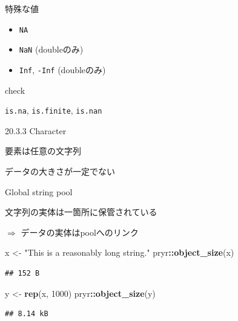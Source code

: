 \documentclass[ignorenonframetext,]{beamer}
\newenvironment{Shaded}{\begin{snugshade}}{\end{snugshade}}
\newcommand{\KeywordTok}[1]{\textcolor[rgb]{0.13,0.29,0.53}{\textbf{#1}}}
\newcommand{\DecValTok}[1]{\textcolor[rgb]{0.00,0.00,0.81}{#1}}
\newcommand{\StringTok}[1]{\textcolor[rgb]{0.31,0.60,0.02}{#1}}
\newcommand{\OperatorTok}[1]{\textcolor[rgb]{0.81,0.36,0.00}{\textbf{#1}}}
\newcommand{\NormalTok}[1]{#1}
\providecommand{\tightlist}{%
  \setlength{\itemsep}{0pt}\setlength{\parskip}{0pt}}
\begin{document}
\begin{frame}[fragile]{特殊な値}

\begin{itemize}
\tightlist
\item
  \texttt{NA}
\item
  \texttt{NaN} (doubleのみ)
\item
  \texttt{Inf}, \texttt{-Inf} (doubleのみ)
\end{itemize}

\begin{block}{check}

\texttt{is.na}, \texttt{is.finite}, \texttt{is.nan}

\end{block}

\end{frame}

\begin{frame}{20.3.3 Character}

要素は任意の文字列

データの大きさが一定でない

\end{frame}

\begin{frame}[fragile]{Global string pool}

文字列の実体は一箇所に保管されている

\(\Rightarrow\) データの実体はpoolへのリンク

\begin{Shaded}
\begin{Highlighting}[]
\NormalTok{x <-}\StringTok{ "This is a reasonably long string."}
\NormalTok{pryr}\OperatorTok{::}\KeywordTok{object_size}\NormalTok{(x)}
\end{Highlighting}
\end{Shaded}

\begin{verbatim}
## 152 B
\end{verbatim}

\begin{Shaded}
\begin{Highlighting}[]
\NormalTok{y <-}\StringTok{ }\KeywordTok{rep}\NormalTok{(x, }\DecValTok{1000}\NormalTok{)}
\NormalTok{pryr}\OperatorTok{::}\KeywordTok{object_size}\NormalTok{(y)}
\end{Highlighting}
\end{Shaded}

\begin{verbatim}
## 8.14 kB
\end{verbatim}

\end{frame}
\end{document}
